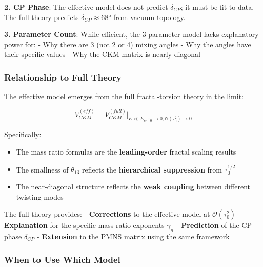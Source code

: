 \textbf{2. CP Phase}: The effective model does not predict $\delta_{CP}$; it must be fit to data. The full theory predicts $\delta_{CP} \approx 68°$ from vacuum topology.

\textbf{3. Parameter Count}: While efficient, the 3-parameter model lacks explanatory power for:
- Why there are 3 (not 2 or 4) mixing angles
- Why the angles have their specific values
- Why the CKM matrix is nearly diagonal

\subsubsection{Relationship to Full Theory}

The effective model emerges from the full fractal-torsion theory in the limit:

\begin{equation}
    \boxed{V_{CKM}^{(eff)} = V_{CKM}^{(full)}\big|_{E \ll E_c, \tau_0 \to 0, \mathcal{O}(\tau_0^2) \to 0}}
\end{equation}

Specifically:

\begin{itemize}
    \item The mass ratio formulas are the \textbf{leading-order} fractal scaling results
    \item The smallness of $\theta_{13}$ reflects the \textbf{hierarchical suppression} from $\tau_0^{1/2}$
    \item The near-diagonal structure reflects the \textbf{weak coupling} between different twisting modes
\end{itemize}

The full theory provides:
- \textbf{Corrections} to the effective model at $\mathcal{O}(\tau_0^2)$
- \textbf{Explanation} for the specific mass ratio exponents $\gamma_n$
- \textbf{Prediction} of the CP phase $\delta_{CP}$
- \textbf{Extension} to the PMNS matrix using the same framework

\subsubsection{When to Use Which Model}

